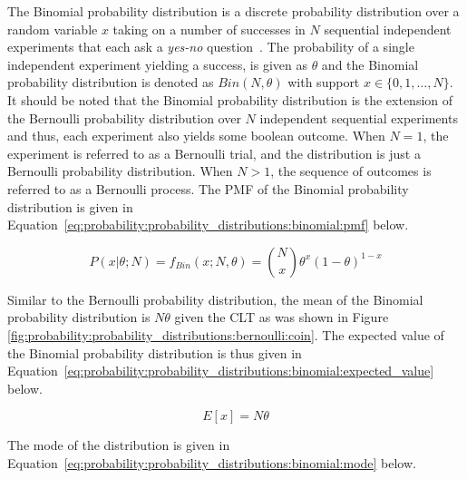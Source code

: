The Binomial probability distribution is a discrete probability distribution over a random variable $x$ taking on a number of successes in $N$ sequential independent experiments that each ask a \textit{yes-no} question~\cite{ref:wackerly:2014}. The probability of a single independent experiment yielding a success, is given as $\theta$ and the Binomial probability distribution is denoted as $Bin(N, \theta)$ with support $x \in \{0, 1, \dots, N\}$.  It should be noted that the Binomial probability distribution is the extension of the Bernoulli probability distribution over $N$ independent sequential experiments and thus, each experiment also yields some boolean outcome. When $N=1$, the experiment is referred to as a Bernoulli trial, and the distribution is just a Bernoulli probability distribution. When $N > 1$, the sequence of outcomes is referred to as a Bernoulli process. The \acf{PMF} of the Binomial probability distribution is given in Equation~\eqref{eq:probability:probability_distributions:binomial:pmf} below.

\begin{equation}
      \label{eq:probability:probability_distributions:binomial:pmf}
      P(x \vert \theta; N) = f_{Bin}(x; N, \theta) = \binom{N}{x} \theta^{x}(1-\theta)^{1-x}
\end{equation}

\noindent
Similar to the Bernoulli probability distribution, the mean of the Binomial probability distribution is $N\theta$ given the \acs{CLT} as was shown in Figure \ref{fig:probability:probability_distributions:bernoulli:coin}. The expected value of the Binomial probability distribution is thus given in Equation~\eqref{eq:probability:probability_distributions:binomial:expected_value} below.

\begin{equation}
      \label{eq:probability:probability_distributions:binomial:expected_value}
      E[x] = N\theta
\end{equation}

\noindent
The mode of the distribution is given in Equation~\eqref{eq:probability:probability_distributions:binomial:mode} below.

